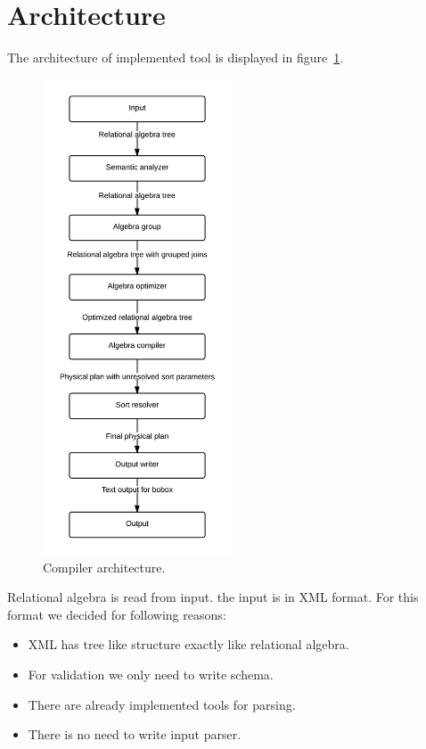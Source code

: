 \section{Architecture}
The architecture of implemented tool is displayed in figure~\ref{fig:compilerarchitecture}.

\begin{figure}[h!]
  \centering
    \includegraphics[width=0.5\textwidth]{compilerarchitecture}

      \caption{Compiler architecture.}
          \label{fig:compilerarchitecture}
\end{figure}

Relational algebra is read from input. the input is in XML format. For this format we decided for following reasons:
\begin{itemize}
\item XML has tree like structure exactly like relational algebra.
\item For validation we only need to write schema.
\item There are already implemented tools for parsing.
\item There is no need to write input parser.
\end{itemize}

